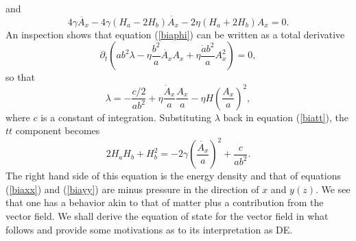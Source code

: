 \documentclass[%
 reprint,
 amsmath,amssymb,
 aps,
]{revtex4-1}
\begin{document}
and
\begin{equation}\label{biaA}
4\gamma\ddot{A_x}-4\gamma(H_a-2H_b)\dot{A_x}-2\eta(H_a+2H_b)A_x=0.
\end{equation}
An inspection shows that equation (\ref{biaphi}) can be written as a total derivative
\begin{equation}
\partial_t\left(ab^2\lambda-\eta \frac{b^2}{a}\dot{A_x}A_x+\eta \frac{\dot{a}b^2}{a}A_x^2\right)=0,
\end{equation}
so that
\begin{equation}
\lambda=-\frac{c/2}{ab^2}+\eta \frac{\dot{A}_x}{a}\frac{A_x}{a}-\eta H \left(\frac{A_x}{a}\right)^2,
\end{equation}
where $c$ is a constant of integration. Substituting $\lambda$ back in equation (\ref{biatt}), the $tt$ component becomes
\begin{equation}\label{Biatt}
2H_aH_b+H_b^2=-2\gamma\left(\frac{\dot{A_x}}{a}\right)^2+\frac{c}{ab^2}.
\end{equation}
The right hand side of this equation is the energy density and that of equations (\ref{biaxx}) and (\ref{biayy}) are minus pressure in the direction of $x$ and $y(z)$. We see that one has a behavior akin to that of matter plus a contribution from the vector field. We shall derive the equation of state for the vector field in what follows and provide some motivations as to its interpretation  as DE.
\end{document}
